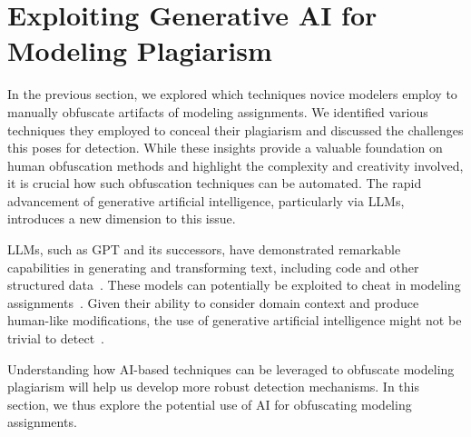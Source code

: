 \section{Exploiting Generative AI for Modeling Plagiarism}\label{sec:ai-plagiarism}

In the previous section, we explored which techniques novice modelers employ to manually obfuscate artifacts of modeling assignments. We identified various techniques they employed to conceal their plagiarism and discussed the challenges this poses for detection. While these insights provide a valuable foundation on human obfuscation methods and highlight the complexity and creativity involved, it is crucial how such obfuscation techniques can be automated. The rapid advancement of generative artificial intelligence, particularly via \acp{LLM}, introduces a new dimension to this issue.

\acp{LLM}, such as \ac{GPT} and its successors, have demonstrated remarkable capabilities in generating and transforming text, including code and other structured data~\cite{Camara2023}. These models can potentially be exploited to cheat in modeling assignments~\cite{Biderman2022}. Given their ability to consider domain context and produce human-like modifications, the use of generative artificial intelligence might not be trivial to detect~\cite{Daun2023}.

Understanding how AI-based techniques can be leveraged to obfuscate modeling plagiarism will help us develop more robust detection mechanisms. In this section, we thus explore the potential use of AI for obfuscating modeling assignments.

